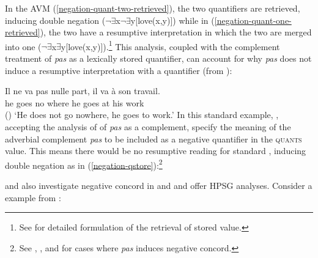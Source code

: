 \documentclass[output=paper,biblatex,babelshorthands,newtxmath,draftmode,colorlinks,citecolor=brown]{langscibook}
\begin{document}
\begin{exe}
\begin{xlist}
\begin{exe}
\begin{xlist}
\eal
\ex
\label{negation-quant-two-retrieved}
\ex
\label{negation-quant-one-retrieved}
\zl
%
%
\noindent
In the AVM (\ref{negation-quant-two-retrieved}), the two quantifiers are retrieved, inducing double negation ($\neg\exists$x$\neg\exists$y[love(x,y)]) while in (\ref{negation-quant-one-retrieved}), the two have a resumptive interpretation in which the two are merged into one ($\neg\exists$x$\exists$y[love(x,y)]).\footnote{See \citet{Swart:02} for detailed formulation of the retrieval of stored value.} This analysis, coupled with the complement treatment of \textit{pas} as a lexically stored quantifier, can account
for why \emph{pas} does not induce a resumptive interpretation with a quantifier (from
\citealt[]{Swart:02}):


\ea
\gll Il ne     va   pas    nulle part, il va   à  son travail.\\
     he \NEG{} goes \NEG{} no    where he goes at his work\\\hfill()
\glt `He does not go nowhere, he goes to work.'
\z
%
In this standard  example, \citet{Swart:02}, accepting
the analysis of \citet{Kim:00} of \textit{pas} as a complement,
specify the meaning of the adverbial complement \emph{pas} to be included as a negative quantifier in the \textsc{quants} value.
 This means there would be no resumptive
reading for standard , inducing double negation as in
(\ref{negation-qstore}):\footnote{See , ,
and  for cases where \textit{pas} induces negative concord.}

\ea
\label{negation-qstore}
\z

\citet{PK:99} and \citet{BJ:00} also  investigate negative concord in  and 
and offer HPSG analyses. Consider a  example from \citet[]{BJ:00}:


\end{xlist}
\end{exe}
\end{xlist}
\end{exe}
\end{document}
